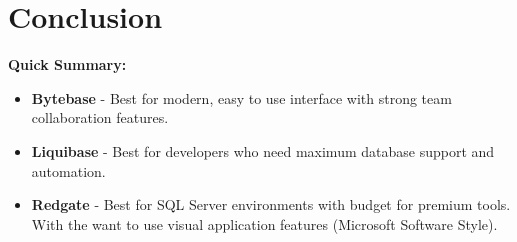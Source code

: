 \documentclass[11pt,a4paper]{article}
\begin{document}
\newpage
\section{Conclusion}

\textbf{Quick Summary:}

\begin{itemize}
    \item \textbf{Bytebase} - Best for modern, easy to use interface with strong team collaboration features.
    \item \textbf{Liquibase} - Best for developers who need maximum database support and automation.
    \item \textbf{Redgate} - Best for SQL Server environments with budget for premium tools. With the want to use visual application features (Microsoft Software Style).
\end{itemize}
\end{document}

